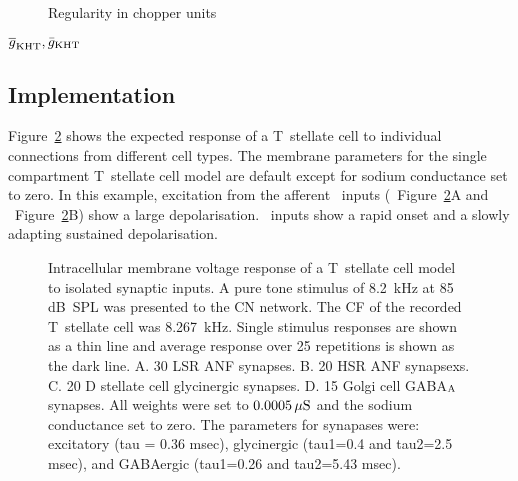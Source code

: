\begin{figure}[htb]
  \centering
  \caption{Regularity in chopper units \citep[Data reproduced from
Fig.~2,~][]{PaoliniClareyEtAl:2005}}
  \label{fig:PaoliniCVdata}
\end{figure}



$\overline{g}_{\rm KHT},\bar{g}_{\rm KHT}$

\subsection{Implementation}






Figure~\ref{fig:TSinputs} shows the expected response of a T~stellate cell
to individual connections from different cell types. The membrane
parameters for the single compartment T~stellate cell model are default
except for sodium conductance set to zero. In this example, excitation from
the afferent \ANF~inputs (\LSR~Figure~\ref{fig:TSinputs}A and
\HSR~Figure~\ref{fig:TSinputs}B) show a large depolarisation.  \HSR~inputs
show a rapid onset and a slowly adapting sustained depolarisation.




\begin{figure}[htb]
  \centering
  \caption[Response of T~stellate cells to isolated synaptic
  inputs]{Intracellular membrane voltage response of a T~stellate cell model to
    isolated synaptic inputs. A pure tone stimulus of 8.2~kHz at 85 dB~SPL was
    presented to the CN network. The CF of the recorded T~stellate cell was
    8.267~kHz.  Single stimulus responses are shown as a thin line and average
    response over 25 repetitions is shown as the dark line. A. 30 LSR ANF
    synapses. B. 20 HSR ANF synapsexs. C. 20 D stellate cell glycinergic
    synapses. D. 15 Golgi cell GABA$_{\rm A}$ synapses. All weights were set to
    $0.0005\,\mu{\rm S}$ and the sodium conductance set to zero.  The parameters
    for synapases were: excitatory (tau = 0.36 msec), glycinergic (tau1=0.4 and
    tau2=2.5 msec), and GABAergic (tau1=0.26 and tau2=5.43
    msec).\label{fig:TSinputs}}
\end{figure}

